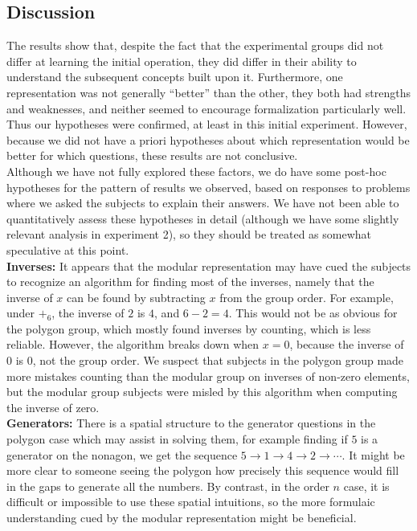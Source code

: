 \documentclass[11pt]{article}
\begin{document}
\subsection{Discussion}
The results show that, despite the fact that the experimental groups did not differ at learning the initial operation, they did differ in their ability to understand the subsequent concepts built upon it. Furthermore, one representation was not generally ``better'' than the other, they both had strengths and weaknesses, and neither seemed to encourage formalization particularly well. Thus our hypotheses were confirmed, at least in this initial experiment. However, because we did not have a priori hypotheses about which representation would be better for which questions, these results are not conclusive. \\[11pt]
Although we have not fully explored these factors, we do have some post-hoc hypotheses for the pattern of results we observed, based on responses to problems where we asked the subjects to explain their answers. We have not been able to quantitatively assess these hypotheses in detail (although we have some slightly relevant analysis in experiment 2), so they should be treated as somewhat speculative at this point.\\[11pt]
\textbf{Inverses:} It appears that the modular representation may have cued the subjects to recognize an algorithm for finding most of the inverses, namely that the inverse of $x$ can be found by subtracting $x$ from the group order. For example, under $+_6$, the inverse of $2$ is $4$, and $6-2 = 4$. This would not be as obvious for the polygon group, which mostly found inverses by counting, which is less reliable. However, the algorithm breaks down when $x = 0$, because the inverse of $0$ is $0$, not the group order. We suspect that subjects in the polygon group made more mistakes counting than the modular group on inverses of non-zero elements, but the modular group subjects were misled by this algorithm when computing the inverse of zero. \\[11pt]
\textbf{Generators:} There is a spatial structure to the generator questions in the polygon case which may assist in solving them, for example finding if $5$ is a generator on the nonagon, we get the sequence $5 \rightarrow 1 \rightarrow 4 \rightarrow 2 \rightarrow \cdots$. It might be more clear to someone seeing the polygon how precisely this sequence would fill in the gaps to generate all the numbers. By contrast, in the order $n$ case, it is difficult or impossible to use these spatial intuitions, so the more formulaic understanding cued by the modular representation might be beneficial.
\end{document}
